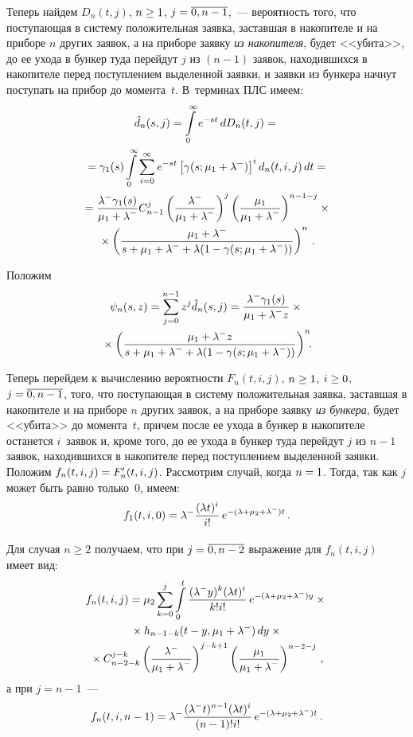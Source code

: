 \begin{multicols}{2}
Теперь найдем $D_n(t,j)$, $n \hm\ge 1$, $j\hm=\overline{0,n-1}$,~--- вероятность того, что поступающая в систему 
положительная заявка,
заставшая в накопителе и на приборе $n$ других заявок, а на приборе заявку
\textit{из накопителя}, будет <<убита>>, до ее ухода в бункер туда перейдут $j$ из $(n-1)$ заявок,
находившихся в накопителе перед поступлением выделенной заявки, и
заявки из бункера начнут поступать на прибор до момента~$t$.
В~терминах ПЛС имеем:
\begin{multline*}
\hat d_n(s,j) = \int\limits_{0}^\infty
e^{-st}\, dD_n(t,j) ={}\\
{}= \gamma_1(s) \int\limits_{0}^{\infty}
\sum\limits_{i=0}^{\infty} e^{-st} \left[\gamma(s;\mu_1 + \lambda^-)\right]^i
d_n(t,i,j) \,dt
= {}\\
{}=
\displaystyle\frac{\displaystyle \lambda^- \gamma_1(s)\mathstrut}{\displaystyle  \mu_1 + \lambda^-\mathstrut}
C_{n-1}^j \left(\displaystyle\frac{\displaystyle \lambda^- \mathstrut}{\displaystyle  \mu_1 + \lambda^-\mathstrut}\right)^j
          \left(\displaystyle\frac{\displaystyle \mu_1 \mathstrut}{\displaystyle \mu_1 + \lambda^-\mathstrut}\right)^{n-1-j}\times{}\\
          {}\times
          \left(\displaystyle\frac{\displaystyle \mu_1+\lambda^-\mathstrut}{\displaystyle s + \mu_1 + \lambda^- + \lambda (1 - \gamma(s;\mu_1 + \lambda^-))\mathstrut}\right)^{n}\,.
\end{multline*}

Положим
\begin{multline*}
\psi_n(s,z)= \sum\limits_{j=0}^{n-1}
z^j \hat d_n(s,j) = \displaystyle\frac{\displaystyle \lambda^- \gamma_1(s)\mathstrut}{\displaystyle \mu_1 + \lambda^- z\mathstrut}\times{}\\
{}\times
          \left(\displaystyle\frac{\displaystyle \mu_1 + \lambda^- z \mathstrut}{\displaystyle 
s + \mu_1 + \lambda^- + \lambda (1 - \gamma(s;\mu_1 + \lambda^-))\mathstrut}\right)^{n}\!\!.
\end{multline*}

Теперь перейдем к вычислению
вероятности $F_n(t,i,j)$, $n\hm\ge 1$, $i \hm\ge 0$, $j\hm=\overline{0,n-1}$, того, что поступающая в систему 
положительная заявка,
заставшая в накопителе и на приборе $n$ других заявок, а на приборе заявку \textit{из бункера},
будет <<убита>> до момента~$t$, причем после ее ухода в бункер в накопителе останется $i$~заявок
и, кроме того, до ее ухода в бункер туда перейдут $j$ из $n-1$ заявок, находившихся в накопителе перед поступлением выделенной
заявки.
Положим $f_n(t,i,j) \hm= F'_n(t,i,j)$.
Рассмотрим случай, когда $n\hm=1$. Тогда, так как $j$ может быть равно только~0, имеем:
$$ 
f_1(t,i,0) = \lambda^- \displaystyle\frac{\displaystyle (\lambda t)^i\mathstrut}{\displaystyle  i! \mathstrut}\, e^{-(\lambda+\mu_2 + \lambda^-) t}\,.
$$

Для случая $n \ge 2$ получаем, что при $j\hm=\overline{0,n-2}$
выражение для $f_n(t,i,j)$ имеет вид:
\begin{multline*}
f_n(t,i,j) = \mu_2 \sum\limits_{k=0}^{j} \int\limits_{0}^{t}
\displaystyle\frac{\displaystyle (\lambda^- y)^k (\lambda t)^i \mathstrut}{\displaystyle k! i!\mathstrut}\,
e^{-(\lambda+\mu_2+\lambda^-) y}\times{}\\
{}\times h_{n-1-k}(t-y,\mu_1+\lambda^-)\,dy
\times {}\\
{}\times C_{n-2-k}^{j-k} \left(\displaystyle\frac{\displaystyle \lambda^- \mathstrut}{\displaystyle \mu_1 + \lambda^-\mathstrut}\right)^{j-k+1}
          \left(\displaystyle\frac{\displaystyle \mu_1\mathstrut}{\displaystyle \mu_1 + \lambda^-\mathstrut}\right)^{n-2-j}\,,
\end{multline*}
а при $j=n-1$~---
$$
f_n(t,i,n-1) = \lambda^- \displaystyle\frac{\displaystyle (\lambda^- t)^{n-1} (\lambda t)^i \mathstrut}{\displaystyle (n-1)! i! \mathstrut}\, e^{-(\lambda+\mu_2+\lambda^-) t}\,.
$$



\end{multicols}
